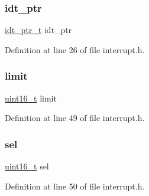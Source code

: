 \subsubsection{\texorpdfstring{idt\+\_\+ptr}{idt\_ptr}}
{\footnotesize\ttfamily \hyperlink{a00065_a4c173f183e148c7a8a8c1ed9214b909e_a4c173f183e148c7a8a8c1ed9214b909e}{idt\+\_\+ptr\+\_\+t} idt\+\_\+ptr}



Definition at line 26 of file interrupt.\+h.

\mbox{\label{a00065_ab28e82ae69032cb4ad3ec3a0be3d7129_ab28e82ae69032cb4ad3ec3a0be3d7129}} 
\subsubsection{\texorpdfstring{limit}{limit}}
{\footnotesize\ttfamily \hyperlink{a00092_a273cf69d639a59973b6019625df33e30_a273cf69d639a59973b6019625df33e30}{uint16\+\_\+t} limit}



Definition at line 49 of file interrupt.\+h.

\mbox{\label{a00065_af0b0a7e10694e3b600c7561311cc8271_af0b0a7e10694e3b600c7561311cc8271}} 
\subsubsection{\texorpdfstring{sel}{sel}}
{\footnotesize\ttfamily \hyperlink{a00092_a273cf69d639a59973b6019625df33e30_a273cf69d639a59973b6019625df33e30}{uint16\+\_\+t} sel}



Definition at line 50 of file interrupt.\+h.

